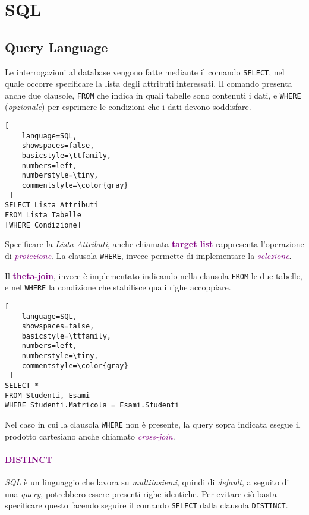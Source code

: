 \section{SQL}

\subsection{Query Language}
Le interrogazioni al database vengono fatte mediante il comando
\verb|SELECT|, nel quale occorre specificare la lista degli attributi interessati.
Il comando presenta anche due clausole, \verb|FROM| che indica in quali tabelle
sono contenuti i dati, e \verb|WHERE| (\emph{opzionale}) per esprimere le condizioni che i dati
devono soddisfare.
\begin{lstlisting}[
    language=SQL,
    showspaces=false,
    basicstyle=\ttfamily,
    numbers=left,
    numberstyle=\tiny,
    commentstyle=\color{gray}
 ]
SELECT Lista Attributi
FROM Lista Tabelle
[WHERE Condizione]
\end{lstlisting}

Specificare la \emph{Lista Attributi}, anche chiamata \textbf{\textcolor{purple}{target list}}
rappresenta l'operazione di \emph{\textcolor{purple}{proiezione}}.
La clausola \verb|WHERE|, invece permette di implementare la \emph{\textcolor{purple}{selezione}}.

Il \textbf{\textcolor{purple}{theta-join}}, invece è implementato indicando nella clausola
\verb|FROM| le due tabelle, e nel \verb|WHERE| la condizione che stabilisce quali righe accoppiare.

\begin{lstlisting}[
    language=SQL,
    showspaces=false,
    basicstyle=\ttfamily,
    numbers=left,
    numberstyle=\tiny,
    commentstyle=\color{gray}
 ]
SELECT *
FROM Studenti, Esami
WHERE Studenti.Matricola = Esami.Studenti
\end{lstlisting}

Nel caso in cui la clausola \verb|WHERE| non è presente, la query sopra indicata esegue il prodotto cartesiano
anche chiamato \emph{\textcolor{purple}{cross-join}}.

\paragraph{\textcolor{purple}{DISTINCT}} \emph{SQL} è un linguaggio che
lavora su \emph{multiinsiemi}, quindi di \emph{default}, a seguito di una \emph{query},
potrebbero essere presenti righe identiche. Per evitare ciò basta specificare questo facendo seguire il comando
\verb|SELECT| dalla clausola \verb|DISTINCT|.

